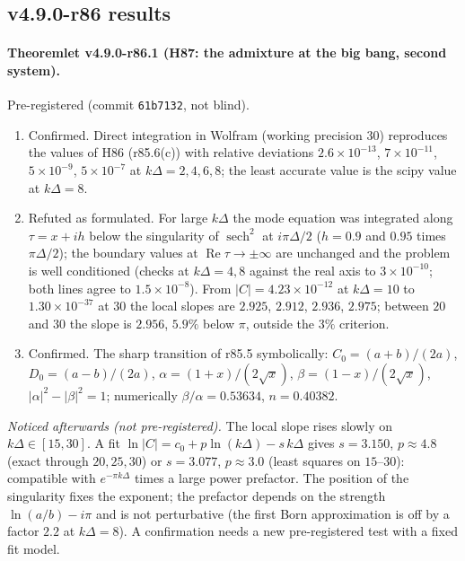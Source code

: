 \subsection*{v4.9.0-r86 results}
\label{subsec:v490-r86-results}

\paragraph{Theoremlet v4.9.0-r86.1 (H87: the admixture at the big bang, second system).}
Pre-registered (commit \texttt{61b7132}, not blind).
\begin{enumerate}[leftmargin=2em]
\item[(a)] Confirmed.  Direct integration in Wolfram (working precision 30) reproduces the values of H86 (r85.6(c)) with relative deviations
\(2.6\times10^{-13}\), \(7\times10^{-11}\), \(5\times10^{-9}\), \(5\times10^{-7}\) at \(k\Delta=2,4,6,8\); the least accurate value is the scipy value at \(k\Delta=8\).
\item[(b)] Refuted as formulated.  For large \(k\Delta\) the mode equation was integrated along \(\tau=x+ih\) below the singularity of
\(\operatorname{sech}^2\) at \(i\pi\Delta/2\) (\(h=0.9\) and \(0.95\) times \(\pi\Delta/2\)); the boundary values at \(\operatorname{Re}\tau\to\pm\infty\) are unchanged and the
problem is well conditioned (checks at \(k\Delta=4,8\) against the real axis to \(3\times10^{-10}\); both lines agree to \(1.5\times10^{-8}\)).  From
\(|C|=4.23\times10^{-12}\) at \(k\Delta=10\) to \(1.30\times10^{-37}\) at \(30\) the local slopes are \(2.925\), \(2.912\), \(2.936\), \(2.975\); between \(20\) and \(30\) the
slope is \(2.956\), \(5.9\%\) below \(\pi\), outside the \(3\%\) criterion.
\item[(c)] Confirmed.  The sharp transition of r85.5 symbolically: \(C_0=(a+b)/(2a)\), \(D_0=(a-b)/(2a)\), \(\alpha=(1+x)/(2\sqrt x)\),
\(\beta=(1-x)/(2\sqrt x)\), \(|\alpha|^2-|\beta|^2=1\); numerically \(\beta/\alpha=0.53634\), \(n=0.40382\).
\end{enumerate}
\emph{Noticed afterwards (not pre-registered).}  The local slope rises slowly on \(k\Delta\in[15,30]\).  A fit
\(\ln|C|=c_0+p\ln(k\Delta)-s\,k\Delta\) gives \(s=3.150\), \(p\approx4.8\) (exact through \(20,25,30\)) or \(s=3.077\), \(p\approx3.0\) (least squares on
\(15\)--\(30\)): compatible with \(e^{-\pi k\Delta}\) times a large power prefactor.  The position of the singularity fixes the exponent; the prefactor
depends on the strength \(\ln(a/b)-i\pi\) and is not perturbative (the first Born approximation is off by a factor \(2.2\) at \(k\Delta=8\)).  A
confirmation needs a new pre-registered test with a fixed fit model.

